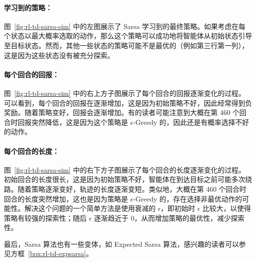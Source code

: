 \paragraph{学习到的策略：}
图~\ref{fig:rl-td-sarsa-sim} 中的左图展示了 Sarsa 学习到的最终策略。如果考虑在每个状态以最大概率选取的动作，那么这个策略可以成功地将智能体从初始状态引导至目标状态。然而，其他一些状态的策略可能不是最优的（例如第三行第一列），这是因为这些状态没有被充分探索。

\paragraph{每个回合的回报：}
图~\ref{fig:rl-td-sarsa-sim} 中的右上方子图展示了每个回合的回报逐渐变化的过程。可以看到，每个回合的回报在逐渐增加，这是因为初始策略不好，因此经常得到负奖励。随着策略变好，回报会逐渐增加。有的读者可能注意到大概在第 460 个回合时回报突然降低，这是因为这个策略是 $\epsilon$-Greedy 的，因此还是有概率选择不好的动作。

\paragraph{每个回合的长度：}
图~\ref{fig:rl-td-sarsa-sim} 中的右下方子图展示了每个回合的长度逐渐变化的过程。初始回合的长度很长，这是因为初始策略不好，智能体在到达目标之前可能多次绕路。随着策略逐渐变好，轨迹的长度逐渐变短。类似地，大概在第 460 个回合时回合的长度突然增加，这也是因为策略是 $\epsilon$-Greedy 的，存在选择非最优动作的可能性。解决这个问题的一个简单方法是使用衰减的 $\epsilon$，即初始时 $\epsilon$ 比较大，以使得策略有较强的探索性；随后 $\epsilon$ 逐渐趋近于 $0$，从而增加策略的最优性，减少探索性。

最后，Sarsa 算法也有一些变体，如 Expected Sarsa 算法，感兴趣的读者可以参见方框~\ref{box:rl-td-expsarsa}。

